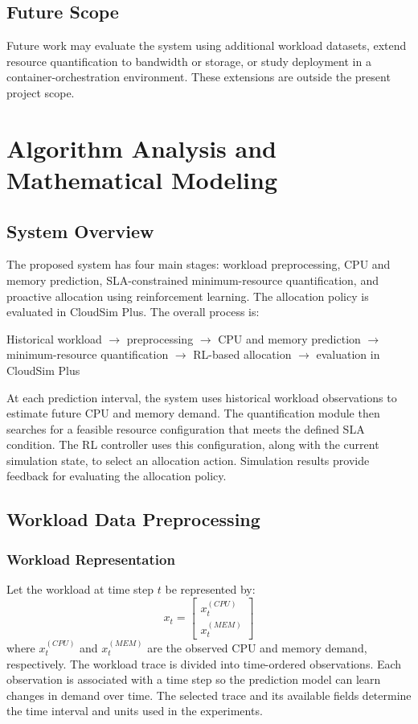 \documentclass[12pt,a4paper]{report}
\begin{document}
\section{Future Scope}
Future work may evaluate the system using additional workload datasets, extend resource quantification to bandwidth or storage, or study deployment in a container-orchestration environment. These extensions are outside the present project scope.

\chapter{Algorithm Analysis and Mathematical Modeling}
\section{System Overview}
The proposed system has four main stages: workload preprocessing, CPU and memory prediction, SLA-constrained minimum-resource quantification, and proactive allocation using reinforcement learning. The allocation policy is evaluated in CloudSim Plus.
The overall process is:
\begin{center}
    Historical workload $\rightarrow$ preprocessing $\rightarrow$ CPU and memory prediction $\rightarrow$ minimum-resource quantification $\rightarrow$ RL-based allocation $\rightarrow$ evaluation in CloudSim Plus
\end{center}
At each prediction interval, the system uses historical workload observations to estimate future CPU and memory demand. The quantification module then searches for a feasible resource configuration that meets the defined SLA condition. The RL controller uses this configuration, along with the current simulation state, to select an allocation action. Simulation results provide feedback for evaluating the allocation policy.
\lipsum[44-46]

\section{Workload Data Preprocessing}
\subsection{Workload Representation}
Let the workload at time step $t$ be represented by:
\begin{equation}
x_{t} = \begin{bmatrix} x_{t}^{(CPU)} \\ x_{t}^{(MEM)} \end{bmatrix}
\end{equation}
where $x_{t}^{(CPU)}$ and $x_{t}^{(MEM)}$ are the observed CPU and memory demand, respectively.
The workload trace is divided into time-ordered observations. Each observation is associated with a time step so the prediction model can learn changes in demand over time. The selected trace and its available fields determine the time interval and units used in the experiments.
\end{document}
